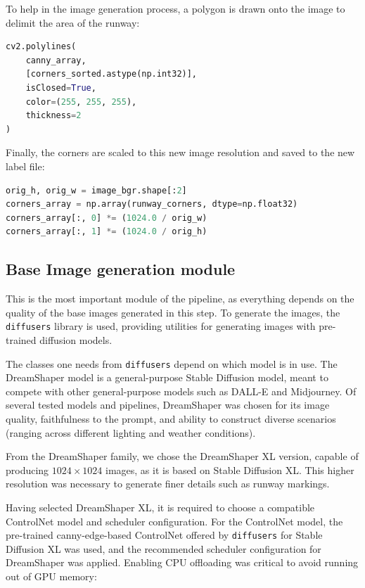 To help in the image generation process, a polygon is drawn onto the image to delimit the area of the runway:

\begin{lstlisting}[language=Python, caption={Edge extraction module,
polygon drawing in canny edge image}]
cv2.polylines(
    canny_array,
    [corners_sorted.astype(np.int32)],
    isClosed=True,
    color=(255, 255, 255),
    thickness=2
)
\end{lstlisting}

Finally, the corners are scaled to this new image resolution and saved to the new label file:

\begin{lstlisting}[language=Python, caption={Edge extraction module,
scaling corners to new resolution}]
orig_h, orig_w = image_bgr.shape[:2]
corners_array = np.array(runway_corners, dtype=np.float32)
corners_array[:, 0] *= (1024.0 / orig_w)
corners_array[:, 1] *= (1024.0 / orig_h)
\end{lstlisting}

\subsection{Base Image generation module}

This is the most important module of the pipeline, as everything depends on the quality of the base images generated in this step. 
To generate the images, the \texttt{diffusers} library
\cite{noauthor_diffusers_nodate} is used, providing utilities for generating
images with pre-trained diffusion models.

The classes one needs from \texttt{diffusers} depend on which model is in use. 
The DreamShaper model \cite{noauthor_dreamshaper_2025} is a general-purpose Stable Diffusion model, meant to compete with other general-purpose models such as DALL-E and Midjourney. 
Of several tested models and pipelines, DreamShaper was chosen for its image quality, faithfulness to the prompt, and ability to construct diverse scenarios (ranging across different lighting and weather conditions).

From the DreamShaper family, we chose the DreamShaper XL version, capable of producing $1024 \times 1024$ images, as it is based on Stable Diffusion XL. 
This higher resolution was necessary to generate finer details such as runway markings.

Having selected DreamShaper XL, it is required to choose a compatible ControlNet
model and scheduler configuration. 
For the ControlNet model, the pre-trained canny-edge-based ControlNet offered by
\texttt{diffusers} for Stable Diffusion XL was used, and the recommended
scheduler configuration for DreamShaper was applied. Enabling CPU offloading was
critical to avoid running out of GPU memory:

